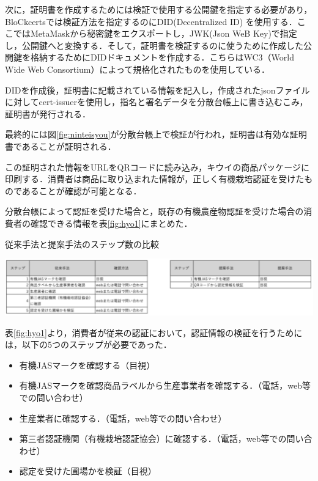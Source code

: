 \documentclass[11pt,dvipdfmx]{jreport}
\begin{document}
   次に，証明書を作成するためには検証で使用する公開鍵を指定する必要があり，BloCkcertsでは検証方法を指定するのにDID(Decentralized ID) を使用する．ここではMetaMaskから秘密鍵をエクスポートし，JWK(Json WeB Key)で指定し，公開鍵へと変換する．そして，証明書を検証するのに使うために作成した公開鍵を格納するためにDIDドキュメントを作成する．こちらはWC3（World Wide Web Consortium）によって規格化されたものを使用している．



DIDを作成後，証明書に記載されている情報を記入し，作成されたjsonファイルに対してcert-issuerを使用し，指名と署名データを分散台帳上に書き込むこみ，証明書が発行される．

最終的には図\ref{fig:ninteisyou}が分散台帳上で検証が行われ，証明書は有効な証明書であることが証明される．

この証明された情報をURLをQRコードに読み込み，キウイの商品パッケージに印刷する．消費者は商品に取り込まれた情報が，正しく有機栽培認証を受けたものであることが確認が可能となる．


分散台帳によって認証を受けた場合と，既存の有機農産物認証を受けた場合の消費者の確認できる情報を表\ref{fig:hyo1}にまとめた．

\begin{table}[ht]
 	\centering
	\caption{従来手法と提案手法のステップ数の比較}
		\includegraphics[width=1.0\linewidth]{Haraguchi_fig/hyou1.pdf}
	\label{fig:hyo1}
\end{table}

表\ref{fig:hyo1}より，消費者が従来の認証において，認証情報の検証を行うためには，以下の5つのステップが必要であった．

\begin{itemize}
  \item 有機JASマークを確認する（目視）
  \item 有機JASマークを確認商品ラベルから生産事業者を確認する．（電話，web等での問い合わせ）
  \item 生産業者に確認する．（電話，web等での問い合わせ）
  \item 第三者認証機関（有機栽培認証協会）に確認する．（電話，web等での問い合わせ）
  \item 認定を受けた圃場かを検証（目視）
\end{itemize}
\end{document}
